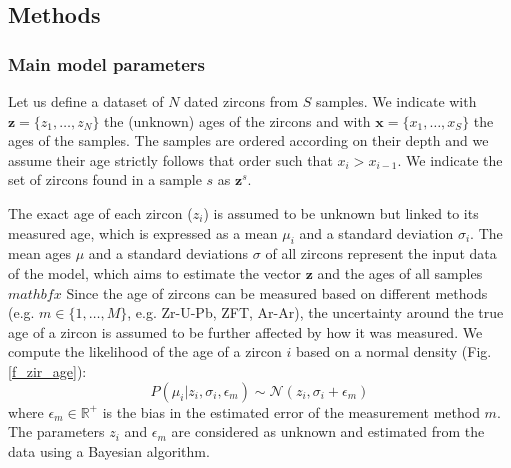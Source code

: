 \documentclass[12pt,letterpaper]{article}
\begin{document}
\begin{flushright}
\end{flushright}
\bigskip
\noindent 

\bigskip
\medskip
\begin{center}

\end{center}

\vspace{1.5in}
\linenumbers
\subsection{Methods}
\subsubsection{Main model parameters}
Let us define a dataset of $N$ dated zircons from $S$ samples. We indicate with $\mathbf{z} = \{z_1, \dots, z_N\}$ the (unknown) ages of the zircons and with $\mathbf{x} = \{x_1, \dots, x_S\}$ the ages of the samples.
The samples are ordered according on their depth and we assume their age strictly follows that order such that $x_{i} > x_{i - 1}$. 
We indicate the set of zircons found in a sample $s$ as $\mathbf{z}^s$.

The exact age of each zircon ($z_i$) is assumed to be unknown but linked to its measured age, which is expressed as a mean $\mu_i$ and a standard deviation $\sigma_i$.
The mean ages $\mu$ and a standard deviations $\sigma$ of all zircons represent the input data of the model, which aims to estimate the vector $\mathbf{z}$ and the ages of all samples $mathbf{x}$
Since the age of zircons can be measured based on different methods (e.g. $m \in \{1, \dots, M \}$, e.g. Zr-U-Pb, ZFT, Ar-Ar), the uncertainty around the true age of a zircon is assumed to be further affected by how it was measured. We compute the likelihood of the age of a zircon $i$ based on a normal density (Fig. \ref{f_zir_age}):
\begin{equation}
P(\mu_i | z_i, \sigma_i, \epsilon_m) \sim \mathcal{N}(z_i, \sigma_i + \epsilon_m)   
\end{equation}
where 
 $\epsilon_m \in \mathbb{R^+}$ is the bias in the estimated error of the measurement method $m$.
The parameters  $z_i$ and $\epsilon_m$ are considered as unknown and estimated from the data using a Bayesian algorithm.
\end{document}
